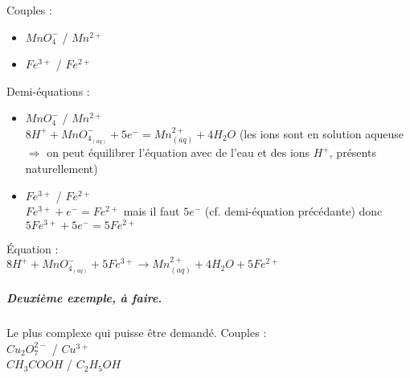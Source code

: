 \documentclass[12pt]{article}
\begin{document}
Couples :
\begin{itemize}
\item \textbf{$MnO_4^-$} / $Mn^{2+}$
\item $Fe^{3+}$ / \textbf{$Fe^{2+}$}
\end{itemize}

Demi-équations :
\begin{itemize}
	\item $MnO_4^-$ / $Mn^{2+}$\\
	$8H^+ + MnO_{4_{(aq)}}^- + 5e^- = Mn^{2+}_{(aq)} + 4H_2O$ (les ions sont en solution aqueuse $\Rightarrow$ on peut équilibrer l'équation avec de l'eau et des ions $H^+$, présents naturellement)
	\item $Fe^{3+}$ / $Fe^{2+}$\\
	$Fe^{3+} + e^- = Fe^{2+}$ mais il faut $5e^-$ (cf. demi-équation précédante) donc $5Fe^{3+} + 5e^- = 5Fe^{2+}$
\end{itemize}

Équation :\\
$8H^+ + MnO_{4_{(aq)}}^- + 5Fe^{3+} \rightarrow Mn^{2+}_{(aq)} + 4H_2O + 5Fe^{2+}$

\subparagraph{Deuxième exemple, à faire.}
Le plus complexe qui puisse être demandé. Couples :\\
$Cu_2O_7^{2-}$ / $Cu^{3+}$\\
$CH_3COOH$ / $C_2H_5OH$
\end{document}

